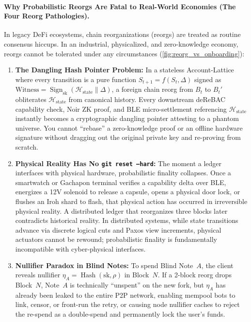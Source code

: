 \documentclass[a4paper,11pt,twoside,parskip=half-,headings=small]{scrartcl}
\newcommand{\code}[1]{\texttt{#1}}
\begin{document}
\paragraph{Why Probabilistic Reorgs Are Fatal to Real-World Economies (The Four Reorg Pathologies).}
In legacy DeFi ecosystems, chain reorganizations (reorgs) are treated as routine consensus hiccups. In an industrial, physicalized, and zero-knowledge economy, reorgs cannot be tolerated under any circumstances (\cref{fig:reorg_vs_onboarding}):
\begin{enumerate}[nosep]
  \item \textbf{The Dangling Hash Pointer Problem:} In a stateless Account-Lattice where every transition is a pure function $S_{t+1} = f(S_t, \Delta)$ signed as $\text{Witness} = \operatorname{Sign}_{\text{sk}}(\mathcal{H}_{\text{state}} \parallel \Delta)$, a foreign chain reorg from $B_t$ to $B_t'$ obliterates $\mathcal{H}_{\text{state}}$ from canonical history. Every downstream deReBAC capability check, Noir ZK proof, and BLE micro-settlement referencing $\mathcal{H}_{\text{state}}$ instantly becomes a cryptographic dangling pointer attesting to a phantom universe. You cannot ``rebase'' a zero-knowledge proof or an offline hardware signature without dragging out the original private key and re-proving from scratch.
  \item \textbf{Physical Reality Has No \code{git reset --hard}:} The moment a ledger interfaces with physical hardware, probabilistic finality collapses. Once a smartwatch or Gachapon terminal verifies a capability delta over BLE, energizes a 12V solenoid to release a capsule, opens a physical door lock, or flushes an Iroh shard to flash, that physical action has occurred in irreversible physical reality. A distributed ledger that reorganizes three blocks later contradicts historical reality. In distributed systems, while state transitions advance via discrete logical cuts and Paxos view increments, physical actuators cannot be rewound; probabilistic finality is fundamentally incompatible with cyber-physical interfaces.
  \item \textbf{Nullifier Paradox in Blind Notes:} To spend Blind Note~$A$, the client reveals nullifier $\eta_A = \operatorname{Hash}(\text{sk}, \rho)$ in Block~$N$. If a 2-block reorg drops Block~$N$, Note~$A$ is technically ``unspent'' on the new fork, but $\eta_A$ has already been leaked to the entire P2P network, enabling mempool bots to link, censor, or front-run the retry, or causing node nullifier caches to reject the re-spend as a double-spend and permanently lock the user's funds.

\end{enumerate}
\end{document}
